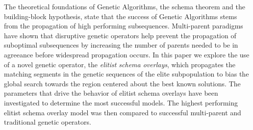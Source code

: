 The theoretical foundations of Genetic Algorithms, the schema theorem and the building-block hypothesis, state that the success of Genetic Algorithms stems from the propagation of high performing subsequences. Multi-parent paradigms have shown that disruptive genetic operators help prevent the propagation of suboptimal subsequences by increasing the number of parents needed to be in agreeance before widespread propagation occurs. In this paper we explore the use of a novel genetic operator, the \emph{elitist schema overlays}, which propagates the matching segments in the genetic sequences of the elite subpopulation to bias the global search towards the region centered about the best known solutions. The parameters that drive the behavior of elitist schema overlays have been investigated to determine the most successful models. The highest performing elitist schema overlay model was then compared to successful multi-parent and traditional genetic operators. 
